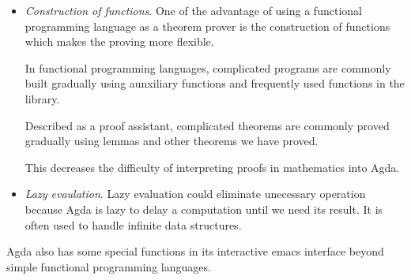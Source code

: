 \begin{itemize}
\item \textit{Construction of functions}. One of the advantage of using a functional programming language as a theorem prover is the construction of functions which makes the proving more flexible.

In functional programming languages, complicated programs are commonly built gradually using aunxiliary functions and frequently used functions in the library.

Described as a proof assistant, complicated theorems are commonly proved gradually using lemmas and other theorems we have proved.

This decreases the difficulty of interpreting proofs in mathematics into Agda.

\item \textit{Lazy evaulation}. Lazy evaluation could eliminate unecessary operation because Agda is lazy to delay a computation until we need its result. It is often used to handle infinite data structures. \cite{wiki:Lazy_evaluation}

\end{itemize}

Agda also has some special functions in its interactive emacs interface beyond simple functional programming languages.


